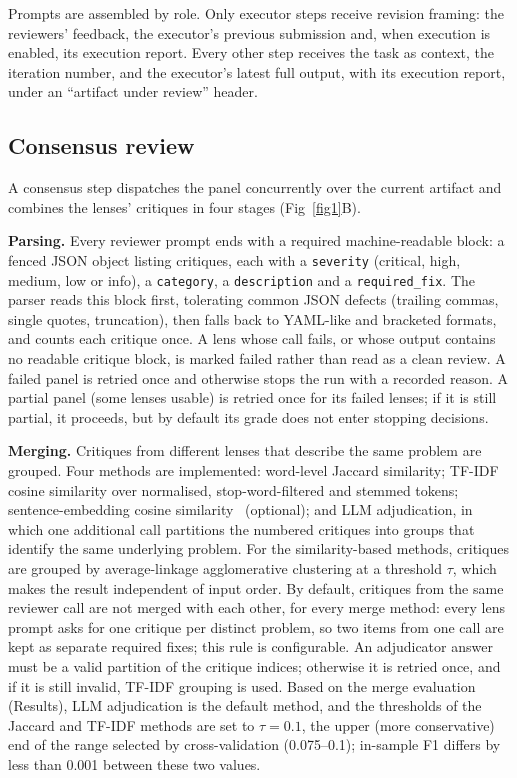 Prompts are assembled by role. Only executor steps receive revision framing: the reviewers' feedback, the executor's previous submission and, when execution is enabled, its execution report. Every other step receives the task as context, the iteration number, and the executor's latest full output, with its execution report, under an ``artifact under review'' header.

\subsection*{Consensus review}

A consensus step dispatches the panel concurrently over the current artifact and combines the lenses' critiques in four stages (Fig~\ref{fig1}B).

\textbf{Parsing.} Every reviewer prompt ends with a required machine-readable block: a fenced JSON object listing critiques, each with a \texttt{severity} (critical, high, medium, low or info), a \texttt{category}, a \texttt{description} and a \texttt{required\_fix}. The parser reads this block first, tolerating common JSON defects (trailing commas, single quotes, truncation), then falls back to YAML-like and bracketed formats, and counts each critique once. A lens whose call fails, or whose output contains no readable critique block, is marked failed rather than read as a clean review. A failed panel is retried once and otherwise stops the run with a recorded reason. A partial panel (some lenses usable) is retried once for its failed lenses; if it is still partial, it proceeds, but by default its grade does not enter stopping decisions.

\textbf{Merging.} Critiques from different lenses that describe the same problem are grouped. Four methods are implemented: word-level Jaccard similarity; TF-IDF cosine similarity over normalised, stop-word-filtered and stemmed tokens; sentence-embedding cosine similarity~\cite{reimers2019sbert} (optional); and LLM adjudication, in which one additional call partitions the numbered critiques into groups that identify the same underlying problem. For the similarity-based methods, critiques are grouped by average-linkage agglomerative clustering at a threshold $\tau$, which makes the result independent of input order. By default, critiques from the same reviewer call are not merged with each other, for every merge method: every lens prompt asks for one critique per distinct problem, so two items from one call are kept as separate required fixes; this rule is configurable. An adjudicator answer must be a valid partition of the critique indices; otherwise it is retried once, and if it is still invalid, TF-IDF grouping is used. Based on the merge evaluation (Results), LLM adjudication is the default method, and the thresholds of the Jaccard and TF-IDF methods are set to $\tau=0.1$, the upper (more conservative) end of the range selected by cross-validation (0.075--0.1); in-sample F1 differs by less than 0.001 between these two values.

